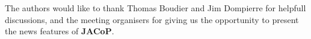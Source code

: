 \documentclass[]{spie}  %
\begin{document}
\acknowledgments     %
The authors would like to thank Thomas Boudier and Jim Dompierre for helpfull discussions, and the meeting organisers for giving us the opportunity to present the news features of \textbf{JACoP}.
\end{document}
